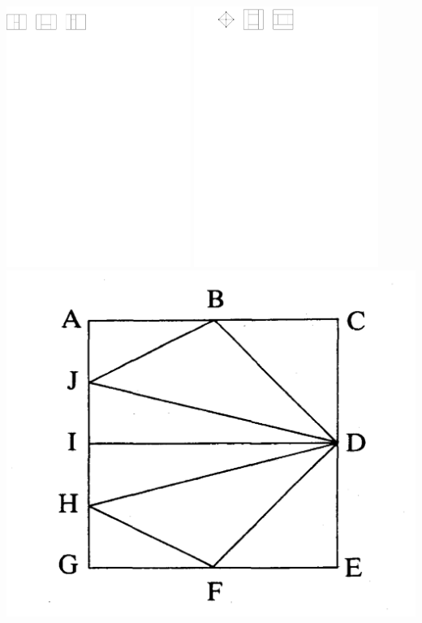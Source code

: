 \documentclass[a4paper]{article}
\begin{document}
\clearpage%
\includegraphics[width = 6cm]{./introduction/img/areaunivLayout.pdf}
\clearpage%
\includegraphics[width=6cm]{./introduction/img/nonuniqueRectDual.pdf}
\clearpage%
\includegraphics[scale=.16]{./introduction/img/rinsma.png}
\end{document}
